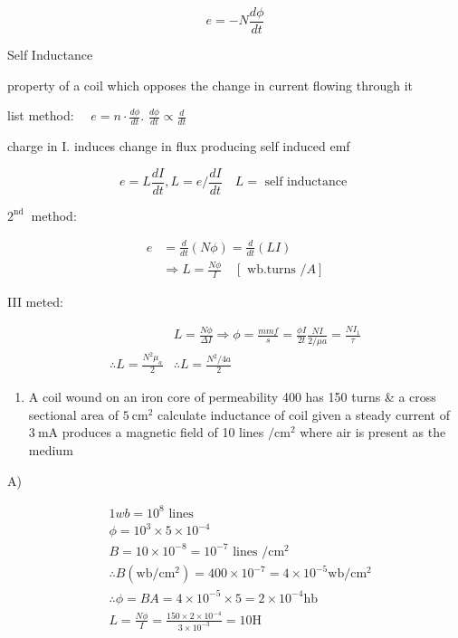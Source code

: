 \documentclass[12pt, a4paper]{article}
\begin{document}
$$
	e=-N \frac{d \phi}{d t}
$$

Self Inductance

property of a coil which opposes the change in current flowing through it

list method: $\quad e=n \cdot \frac{d \phi}{d t}$. $\frac{d \phi}{d t} \propto \frac{d}{d t}$

charge in I. induces change in flux producing self induced emf

$$
	e=L \frac{d I}{d t}, L=e / \frac{d I}{d t} \quad L=\text { self inductance }
$$

$2^{\text {nd }}$ method:

$$
	\begin{aligned}
		e & =\frac{d}{d t}(N \phi)=\frac{d}{d t}(L I)                    \\
		  & \Rightarrow L=\frac{N \phi}{I} \quad[\text { wb.turns } / A]
	\end{aligned}
$$

III meted:

$$
	\begin{aligned}
		                                     & L=\frac{N \phi}{\Delta I} \Rightarrow \phi=\frac{m m f}{s}=\frac{\phi I}{2 t} \frac{N I}{2 / \mu a}=\frac{N I_{1}}{\tau} \\
		\therefore L=\frac{N^{2} \mu_{a}}{2} & \therefore L=\frac{N^{2} / 4 a}{2}
	\end{aligned}
$$

\begin{enumerate}
	\item A coil wound on an iron core of permeability 400 has 150 turns \& a cross sectional area of $5 \mathrm{~cm}^{2}$ calculate inductance of coil given a steady current of $3 \mathrm{~mA}$ produces a magnetic field of 10 lines $/ \mathrm{cm}^{2}$ where air is present as the medium
\end{enumerate}

A)

$$
	\begin{aligned}
		 & 1 w b=10^{8} \text { lines }                                                                                             \\
		 & \phi=10^{3} \times 5 \times 10^{-4}                                                                                      \\
		 & B=10 \times 10^{-8}=10^{-7} \text { lines } / \mathrm{cm}^{2}                                                            \\
		 & \therefore B\left(\mathrm{wb} / \mathrm{cm}^{2}\right)=400 \times 10^{-7}=4 \times 10^{-5} \mathrm{wb} / \mathrm{cm}^{2} \\
		 & \therefore \phi=B A=4 \times 10^{-5} \times 5=2 \times 10^{-4} \mathrm{hb}                                               \\
		 & L=\frac{N \phi}{I}=\frac{150 \times 2 \times 10^{-4}}{3 \times 10^{-3}}=10 \mathrm{H}
	\end{aligned}
$$
\end{document}
